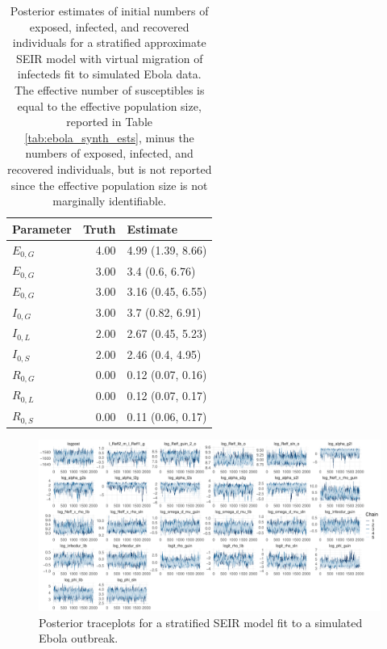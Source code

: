 \begin{table}[ht]
	\caption[Posterior estimates of initial numbers of exposed, infected, and recovered individuals for a stratified SEIR model fit to simulated Ebola data.]{Posterior estimates of initial numbers of exposed, infected, and recovered individuals for a stratified approximate SEIR model with virtual migration of infecteds fit to simulated Ebola data. The effective number of susceptibles is equal to the effective population size, reported in Table \ref{tab:ebola_synth_ests}, minus the numbers of exposed, infected, and recovered individuals, but is not reported since the effective population size is not marginally identifiable.}
	\centering
	\begin{tabular}{lrl}
		\hline
		\textbf{Parameter} & \textbf{Truth} & \textbf{Estimate} \\ 
		\hline
		$ E_{0,G} $& 4.00 & 4.99 (1.39, 8.66) \\ 
		$ E_{0,G} $& 3.00 & 3.4 (0.6, 6.76) \\ 
		$ E_{0,G} $& 3.00 & 3.16 (0.45, 6.55) \\ 
		$ I_{0,G} $& 3.00 & 3.7 (0.82, 6.91) \\ 
		$ I_{0,L} $& 2.00 & 2.67 (0.45, 5.23) \\ 
		$ I_{0,S} $& 2.00 & 2.46 (0.4, 4.95) \\ 
		$ R_{0,G} $& 0.00 & 0.12 (0.07, 0.16) \\ 
		$ R_{0,L} $	& 0.00 & 0.12 (0.07, 0.17) \\ 
		$ R_{0,S} $& 0.00 & 0.11 (0.06, 0.17) \\ 
		\hline
	\end{tabular}
\end{table}

\begin{figure}
	\centering
	\includegraphics[width=\linewidth]{figures/ebola_synth_traces}
	\caption{Posterior traceplots for a stratified SEIR model fit to a simulated Ebola outbreak.}
	\label{fig:ebolasynthtraces}
\end{figure}

